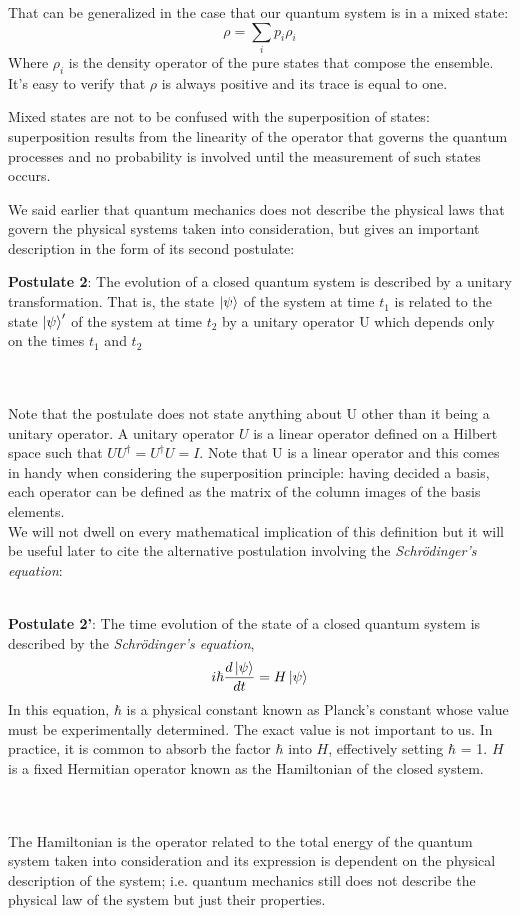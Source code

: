 \documentclass[journal, letterpaper]{IEEEtran}
\begin{document}
That can be generalized in the case that our quantum system is in a mixed state:
\[\rho = \sum_i p_i \rho_i\]
Where $\rho_i$ is the density operator of the pure states that compose the ensemble. It's easy to verify that $\rho$ is always positive and its trace is equal to one. 

Mixed states are not to be confused with the superposition of states: superposition results from the linearity of the operator that governs the quantum processes and no probability is involved until the measurement of such states occurs.

We said earlier that quantum mechanics does not describe the physical laws that govern the physical systems taken into consideration, but gives an important description in the form of its second postulate:\\

\begin{minipage}{0.96\linewidth}
\textbf{Postulate 2}: The evolution of a closed quantum system is described by a unitary
    transformation. That is, the state $\ket{\psi}$ of the system at time $t_1$ is related to the state $\ket{\psi}'$
    of the system at time $t_2$ by a unitary operator U which depends only on the times $t_1$ and $t_2$ \cite{chuang}
\end{minipage} \\ \\

Note that the postulate does not state anything about U other than it being a unitary operator. A unitary operator $U$ is a linear operator defined on a Hilbert space such that $UU^\dagger = U^\dagger U = I$. Note that U is a linear operator and this comes in handy when considering the superposition principle: having decided a basis, each operator can be defined as the matrix of the column images of the basis elements.\\
We will not dwell on every mathematical implication of this definition but it will be useful later to cite the alternative postulation involving the \textit{Schr{\"o}dinger's equation}:\\ \\

\begin{minipage}{0.96\linewidth}
\textbf{Postulate 2'}: The time evolution of the state of a closed quantum system is described by the \textit{Schr{\"o}dinger's equation}, \[i\hbar\frac{d\ket{\psi}}{dt} = H\ket{\psi}\] In this equation, $\hbar$ is a physical constant known as Planck’s constant whose value must be experimentally determined. The exact value is not important to us. In practice, it is common to absorb the factor $\hbar$ into $H$, effectively setting $\hbar$ = 1. $H$ is a fixed Hermitian operator known as the Hamiltonian of the closed system. \cite{chuang}
\end{minipage} \\ \\
The Hamiltonian is the operator related to the total energy of the quantum system taken into consideration and its expression is dependent on the physical description of the system; i.e. quantum mechanics still does not describe the physical law of the system but just their properties.
\end{document}

